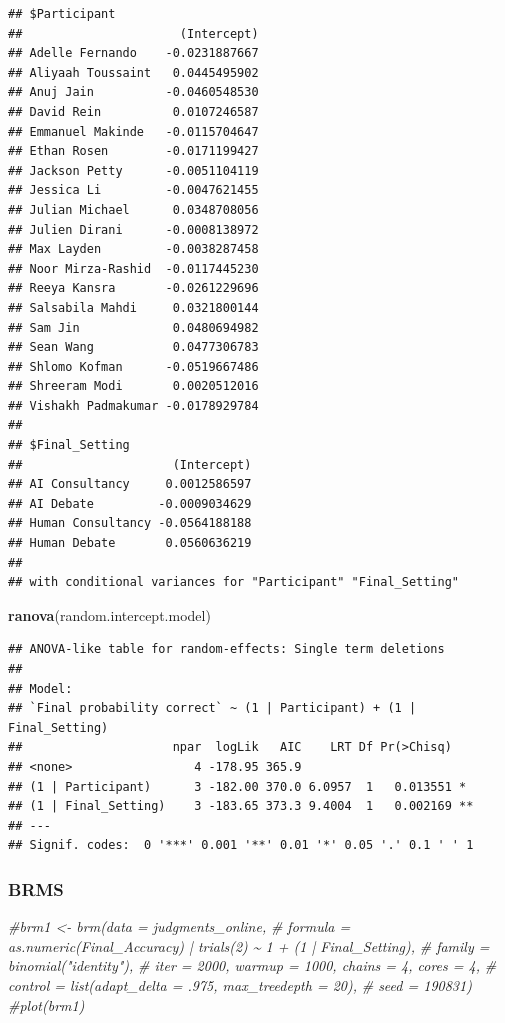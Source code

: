 \documentclass[
]{article}
\newenvironment{Shaded}{\begin{snugshade}}{\end{snugshade}}
\newcommand{\CommentTok}[1]{\textcolor[rgb]{0.56,0.35,0.01}{\textit{#1}}}
\newcommand{\FunctionTok}[1]{\textcolor[rgb]{0.13,0.29,0.53}{\textbf{#1}}}
\newcommand{\NormalTok}[1]{#1}
\begin{document}
\begin{verbatim}
## $Participant
##                      (Intercept)
## Adelle Fernando    -0.0231887667
## Aliyaah Toussaint   0.0445495902
## Anuj Jain          -0.0460548530
## David Rein          0.0107246587
## Emmanuel Makinde   -0.0115704647
## Ethan Rosen        -0.0171199427
## Jackson Petty      -0.0051104119
## Jessica Li         -0.0047621455
## Julian Michael      0.0348708056
## Julien Dirani      -0.0008138972
## Max Layden         -0.0038287458
## Noor Mirza-Rashid  -0.0117445230
## Reeya Kansra       -0.0261229696
## Salsabila Mahdi     0.0321800144
## Sam Jin             0.0480694982
## Sean Wang           0.0477306783
## Shlomo Kofman      -0.0519667486
## Shreeram Modi       0.0020512016
## Vishakh Padmakumar -0.0178929784
## 
## $Final_Setting
##                     (Intercept)
## AI Consultancy     0.0012586597
## AI Debate         -0.0009034629
## Human Consultancy -0.0564188188
## Human Debate       0.0560636219
## 
## with conditional variances for "Participant" "Final_Setting"
\end{verbatim}

\begin{Shaded}
\begin{Highlighting}[]
\FunctionTok{ranova}\NormalTok{(random.intercept.model)}
\end{Highlighting}
\end{Shaded}

\begin{verbatim}
## ANOVA-like table for random-effects: Single term deletions
## 
## Model:
## `Final probability correct` ~ (1 | Participant) + (1 | Final_Setting)
##                     npar  logLik   AIC    LRT Df Pr(>Chisq)   
## <none>                 4 -178.95 365.9                        
## (1 | Participant)      3 -182.00 370.0 6.0957  1   0.013551 * 
## (1 | Final_Setting)    3 -183.65 373.3 9.4004  1   0.002169 **
## ---
## Signif. codes:  0 '***' 0.001 '**' 0.01 '*' 0.05 '.' 0.1 ' ' 1
\end{verbatim}

\subsubsection{BRMS}\label{brms}

\begin{Shaded}
\begin{Highlighting}[]
\CommentTok{\#brm1 \textless{}{-} brm(data = judgments\_online,}
\CommentTok{\#             formula = as.numeric(Final\_Accuracy) | trials(2) \textasciitilde{} 1 + (1 | Final\_Setting),}
\CommentTok{\#             family = binomial("identity"),}
\CommentTok{\#             iter = 2000, warmup = 1000, chains = 4, cores = 4,}
\CommentTok{\#             control = list(adapt\_delta = .975, max\_treedepth = 20),}
\CommentTok{\#             seed = 190831)}
\CommentTok{\#plot(brm1)}
\end{Highlighting}
\end{Shaded}
\end{document}

